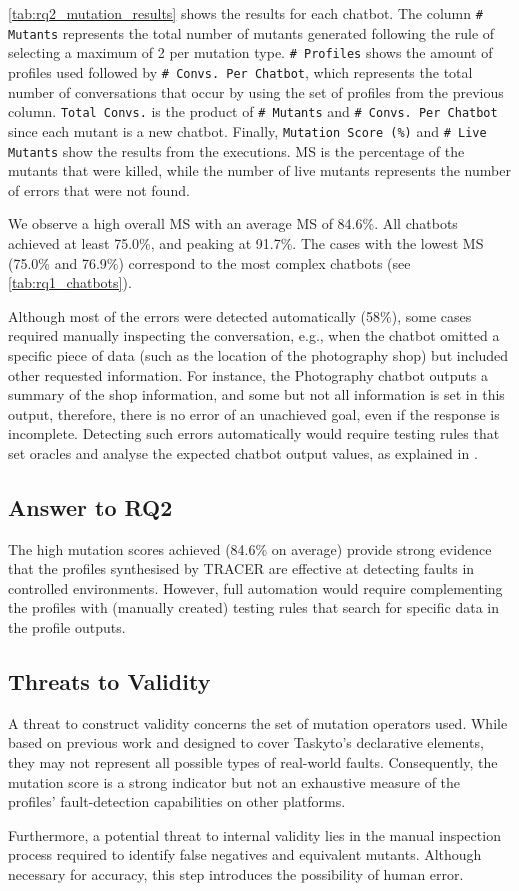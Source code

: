 \autoref{tab:rq2_mutation_results}
shows the results for each chatbot.
The column \texttt{\# Mutants} represents
the total number of mutants generated
following the rule of selecting a maximum of 2 per mutation type.
\texttt{\# Profiles} shows the amount of profiles used
followed by \texttt{\# Convs. Per Chatbot},
which represents the total number of conversations
that occur by using the set of profiles from the previous column.
\texttt{Total Convs.} is the product of
\texttt{\# Mutants} and \texttt{\# Convs. Per Chatbot}
since each mutant is a new chatbot.
Finally, \texttt{Mutation Score (\%)} and \texttt{\# Live Mutants}
show the results from the executions.
\ac{MS} is the percentage of the mutants that were killed,
while the number of live mutants
represents the number of errors that were not found.

We observe a high overall \acl{MS}
with an average \ac{MS} of 84.6\%.
All chatbots achieved at least 75.0\%,
and peaking at 91.7\%.
The cases with the lowest \ac{MS}
(75.0\% and 76.9\%)
correspond to the most complex chatbots
(see \autoref{tab:rq1_chatbots}).

Although most of the errors were detected automatically (58\%),
some cases required manually inspecting the conversation,
e.g., when the chatbot omitted a specific piece of data
(such as the location of the photography shop)
but included other requested information.
For instance, the Photography chatbot outputs a summary of the shop information,
and some but not all information is set in this output,
therefore, there is no error of an unachieved goal,
even if the response is incomplete.
Detecting such errors automatically
would require testing rules that set oracles
and analyse the expected chatbot output values,
as explained in \autocite{delaraSensei}.

\subsection{Answer to RQ2}

The high mutation scores achieved (84.6\% on average)
provide strong evidence
that the profiles synthesised by TRACER are effective
at detecting faults in controlled environments.
However, full automation would require
complementing the profiles with (manually created) testing rules
that search for specific data in the profile outputs.


\subsection{Threats to Validity}
A threat to construct validity
concerns the set of mutation operators used.
While based on previous work
and designed to cover Taskyto's declarative elements,
they may not represent
all possible types of real-world faults.
Consequently, the mutation score
is a strong indicator
but not an exhaustive measure
of the profiles' fault-detection capabilities on other platforms.

Furthermore,
a potential threat to internal validity
lies in the manual inspection process required
to identify false negatives and equivalent mutants.
Although necessary for accuracy,
this step introduces the possibility of human error.
